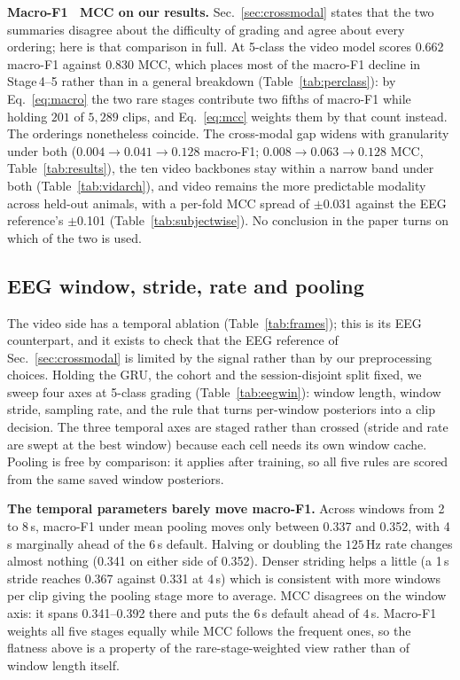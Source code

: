 \noindent\textbf{Macro-F1 \vs\ MCC on our results.}
Sec.~\ref{sec:crossmodal} states that the two summaries disagree about the
difficulty of grading and agree about every ordering; here is that comparison in
full. At 5-class the video model scores 0.662 macro-F1 against 0.830 MCC, which
places most of the macro-F1 decline in Stage\,4--5 rather than in a general
breakdown (Table~\ref{tab:perclass}): by Eq.~\eqref{eq:macro} the two rare stages
contribute two fifths of macro-F1 while holding $201$ of $5{,}289$ clips, and
Eq.~\eqref{eq:mcc} weights them by that count instead. The orderings nonetheless
coincide. The cross-modal gap widens with granularity under both
($0.004\!\to\!0.041\!\to\!0.128$ macro-F1;
$0.008\!\to\!0.063\!\to\!0.128$ MCC, Table~\ref{tab:results}), the ten video
backbones stay within a narrow band under both (Table~\ref{tab:vidarch}), and video
remains the more predictable modality across held-out animals, with a per-fold MCC
spread of $\pm$0.031 against the EEG reference's $\pm$0.101
(Table~\ref{tab:subjectwise}). No conclusion in the paper turns on which of the two
is used.

\subsection{EEG window, stride, rate and pooling}
\label{sec:eegsweep}
The video side has a temporal ablation (Table~\ref{tab:frames}); this is its EEG
counterpart, and it exists to check that the EEG reference of
Sec.~\ref{sec:crossmodal} is limited by the signal rather than by our preprocessing
choices. Holding the GRU, the cohort and the
session-disjoint split fixed, we sweep four axes at 5-class grading
(Table~\ref{tab:eegwin}): window length, window stride, sampling rate, and the rule
that turns per-window posteriors into a clip decision. The three temporal axes are
staged rather than crossed (stride and rate are swept at the best window) because
each cell needs its own window cache. Pooling is free by comparison: it applies after
training, so all five rules are scored from the same saved window posteriors.

\noindent\textbf{The temporal parameters barely move macro-F1.}
Across windows from 2 to 8\,s, macro-F1 under mean pooling moves only between 0.337
and 0.352, with 4\,s marginally ahead of the 6\,s default. Halving or doubling the
$125$\,Hz rate changes almost nothing (0.341 on either side of 0.352). Denser
striding helps a little (a 1\,s stride reaches 0.367 against 0.331 at 4\,s) which is
consistent with more windows per clip giving the pooling stage more to average. MCC disagrees on the window axis: it spans 0.341--0.392 there and puts the $6$\,s
default ahead of $4$\,s. Macro-F1 weights all five stages equally while MCC follows
the frequent ones, so the flatness above is a property of the rare-stage-weighted
view rather than of window length itself.

